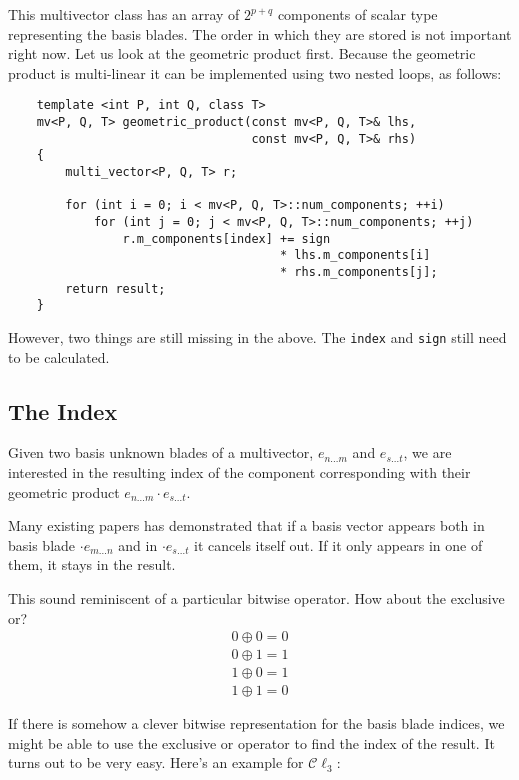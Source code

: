 \documentclass[10pt]{article}
\begin{document}
This multivector class has an array of $2^{p+q}$ components of scalar type representing the basis blades. The order in which they are stored is not important right now. Let us look at the geometric product first. Because the geometric product is multi-linear it can be implemented using two nested loops, as follows:

\begin{verbatim}
    template <int P, int Q, class T>
    mv<P, Q, T> geometric_product(const mv<P, Q, T>& lhs,
                                  const mv<P, Q, T>& rhs)
    {
        multi_vector<P, Q, T> r;

        for (int i = 0; i < mv<P, Q, T>::num_components; ++i)
            for (int j = 0; j < mv<P, Q, T>::num_components; ++j)
                r.m_components[index] += sign
                                      * lhs.m_components[i]
                                      * rhs.m_components[j];
        return result;
    }
\end{verbatim}

However, two things are still missing in the above. The \verb"index" and \verb"sign" still need to be calculated.

\subsection{The Index}

Given two basis unknown blades of a multivector, $e_{n\ldots m}$ and $e_{s\ldots t}$, we are interested in the resulting index of the component corresponding with their geometric product $e_{n\ldots m} \cdot e_{s\ldots t}$.

Many existing papers \cite{bib:primer} has demonstrated that if a basis vector appears both in basis blade $\cdot e_{m\ldots n}$ and in $\cdot e_{s\ldots t}$ it cancels itself out. If it only appears in one of them, it stays in the result.

This sound reminiscent of a particular bitwise operator. How about the exclusive or?
\begin{align*}
    0 \oplus 0 = 0 \\
    0 \oplus 1 = 1 \\
    1 \oplus 0 = 1 \\
    1 \oplus 1 = 0
\end{align*}

If there is somehow a clever bitwise representation for the basis blade indices, we might be able to use the exclusive or operator to find the index of the result. It turns out to be very easy. Here's an example for $\mathcal{C}\ell_3$:
\end{document}
